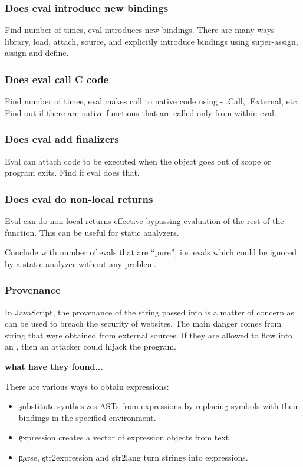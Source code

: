 \documentclass[USenglish,cleveref, autoref, thm-restate]{lipics-v2019}
\begin{document}
\subsubsection{Does eval introduce new bindings}
Find number of times, eval introduces new bindings. There are many ways -- library,
load, attach, source, and explicitly introduce bindings using super-assign, assign and define.

\subsubsection{Does eval call C code}
Find number of times, eval makes call to native code using - .Call, .External,
etc. Find out if there are native functions that are called only from within eval.

\subsubsection{Does eval add finalizers}
Eval can attach code to be executed when the object goes out of scope or program
exits. Find if eval does that.

\subsubsection{Does eval do non-local returns}
Eval can do non-local returns effective bypassing evaluation of the rest of the
function. This can be useful for static analyzers.

Conclude with number of evals that are ``pure'', i.e. evals which
could be ignored by a static analyzer without any problem.

\subsubsection{Provenance}

In JavaScript, the provenance of the string passed into \eval is a matter of
concern as \eval can be used to breach the security of websites. The main
danger comes from string that were obtained from external sources. If they
are allowed to flow into an \eval, then an attacker could hijack the
program.

{\bf what have they found...}

There are various ways to obtain expressions:
\begin{itemize}
  \item \c{substitute} synthesizes ASTs from expressions by replacing
    symbols with their bindings in the specified environment.
  \item \c{expression}  creates a vector of expression
    objects from text.
  \item \c{parse}, \c{str2expression} and \c{str2lang} turn strings into
    expressions.
\end{itemize}
\end{document}
